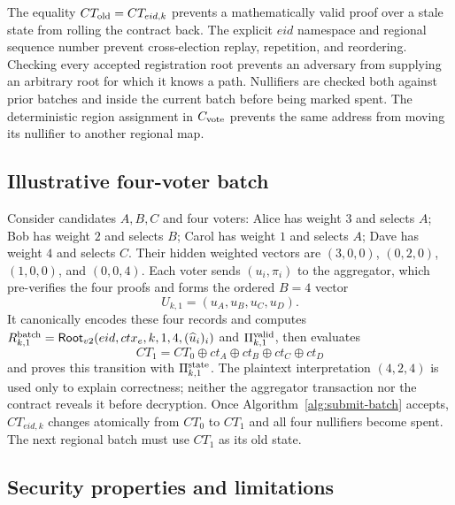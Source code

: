 \documentclass[pdflatex,sn-mathphys-num]{sn-jnl}%
\theoremstyle{thmstyleone}%
\theoremstyle{thmstyletwo}%
\theoremstyle{thmstylethree}%
\begin{document}
The equality $CT_{\rm old}=CT_{eid,k}$ prevents a mathematically valid proof over a stale state from rolling the contract back. The explicit $eid$ namespace and regional sequence number prevent cross-election replay, repetition, and reordering. Checking every accepted registration root prevents an adversary from supplying an arbitrary root for which it knows a path. Nullifiers are checked both against prior batches and inside the current batch before being marked spent. The deterministic region assignment in $C_{\rm vote}$ prevents the same address from moving its nullifier to another regional map.

\subsection{Illustrative four-voter batch}\label{subsec:batch-example}

Consider candidates $A,B,C$ and four voters: Alice has weight $3$ and selects $A$; Bob has weight $2$ and selects $B$; Carol has weight $1$ and selects $A$; Dave has weight $4$ and selects $C$. Their hidden weighted vectors are $(3,0,0)$, $(0,2,0)$, $(1,0,0)$, and $(0,0,4)$. Each voter sends $(u_i,\pi_i)$ to the aggregator, which pre-verifies the four proofs and forms the ordered $B=4$ vector
\[
 U_{k,1}=(u_A,u_B,u_C,u_D).
\]
It canonically encodes these four records and computes
$R^{\rm batch}_{k,1}=\mathsf{Root}_{v2}
(eid,ctx_e,k,1,4,(\widehat u_i)_i)$ and
$\Pi^{\rm valid}_{k,1}$, then evaluates
\[
 CT_1=CT_0\oplus ct_A\oplus ct_B\oplus ct_C\oplus ct_D
\]
and proves this transition with $\Pi^{\rm state}_{k,1}$. The plaintext interpretation $(4,2,4)$ is used only to explain correctness; neither the aggregator transaction nor the contract reveals it before decryption. Once Algorithm~\ref{alg:submit-batch} accepts, $CT_{eid,k}$ changes atomically from $CT_0$ to $CT_1$ and all four nullifiers become spent. The next regional batch must use $CT_1$ as its old state.

\subsection{Security properties and limitations}\label{subsec:batch-security}
\end{document}
